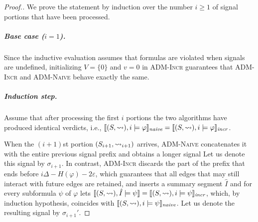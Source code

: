 \begin{proof}[\normalsize Proof.]
	\normalsize
%	
%	
%	

	We prove the statement by induction over the number $i \geq 1$ of signal portions that have been processed.
	
	\subparagraph*{Base case ($i = 1$).}
	Since the inductive evaluation assumes that formulas are violated when signals are undefined, initializing $V = \{0\}$ and $v=0$ in \textsc{ADM-Incr} guarantees that \textsc{ADM-Incr} and \textsc{ADM-Naive} behave exactly the same.
	
	
	\subparagraph*{Induction step.}
	Assume that after processing the first $i$ portions the two algorithms have
	produced identical verdicts, i.e., $ \llbracket (S,\rightsquigarrow), i \models \varphi \rrbracket_{\textit{naive}} = \llbracket (S,\rightsquigarrow), i \models \varphi \rrbracket_{\textit{incr}}$.
	
	When the $(i+1)$st portion $(S_{i+1},\rightsquigarrow_{i+1})$ arrives, \textsc{ADM-Naive} concatenates it with the entire previous signal prefix and obtains a longer signal
	Let us denote this signal by $\sigma_{i+1}$.
	In contrast, \textsc{ADM-Incr} discards the part of the prefix that ends before $i\Delta - H(\varphi) - 2\varepsilon$, which guarantees that all edges that may still interact with future edges are retained, and inserts a summary segment
	$\hat{I}$ and for every subformula $\psi$ of $\varphi$ lets $\llbracket (S,\rightsquigarrow), \hat{I} \models \psi \rrbracket = \llbracket (S,\rightsquigarrow), i \models \psi \rrbracket_{\textit{incr}}$, which, by induction hypothesis, coincides with $\llbracket (S,\rightsquigarrow), i \models \psi \rrbracket_{\textit{naive}}$.
	Let us denote the resulting signal by $\sigma_{i+1}'$.
	

\end{proof}
